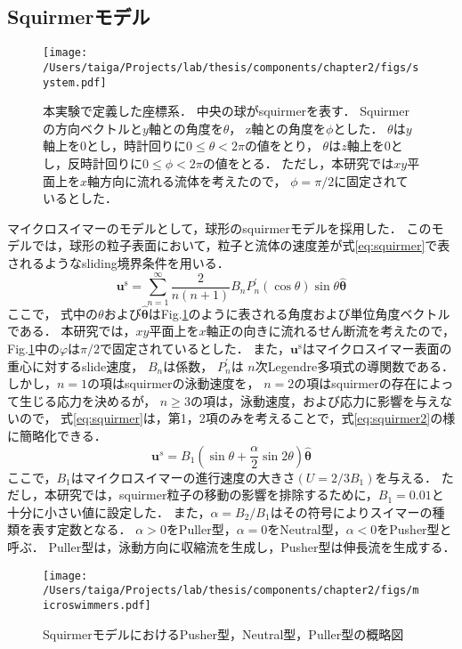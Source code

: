 \subsection{Squirmerモデル}
\label{sec:squirmer}
    \begin{figure}[htbp]
        \centering
        \texttt{[image: /Users/taiga/Projects/lab/thesis/components/chapter2/figs/system.pdf]}
        \caption{本実験で定義した座標系．
        中央の球がsquirmerを表す．
        Squirmerの方向ベクトルと$y$軸との角度を$\theta$，
        z軸との角度を$\phi$とした．
        $\theta$は$y$軸上を$0$とし，時計回りに$0 \leq \theta < 2 \pi$の値をとり，
        $\theta$は$z$軸上を$0$とし，反時計回りに$0 \leq \phi < 2 \pi$の値をとる．
        ただし，本研究では$xy$平面上を$x$軸方向に流れる流体を考えたので，
        $\phi = \pi / 2$に固定されているとした．}
        \label{fig:system}
    \end{figure}

マイクロスイマーのモデルとして，球形のsquirmerモデル\cite{squirmer}を採用した．
このモデルでは，球形の粒子表面において，粒子と流体の速度差が式\eqref{eq:squirmer}で表されるようなsliding境界条件を用いる．
    \begin{equation}
        \boldsymbol{u}^\mathrm{s} = 
            \sum_{n=1}^\infty\frac{2}{n(n + 1)} B_n P_n^\prime(\cos{\theta}) \sin{\theta} \hat{\boldsymbol{\theta}}
        \label{eq:squirmer}
    \end{equation}
ここで， 式中の$\theta$および$\boldsymbol{\hat{\theta}}$はFig.\ref{fig:system}のように表される角度および単位角度ベクトルである．
本研究では，$xy$平面上を$x$軸正の向きに流れるせん断流を考えたので，
Fig.\ref{fig:system}中の$\varphi$は$\pi / 2$で固定されているとした．
また，$\boldsymbol{u}^\mathrm{s}$はマイクロスイマー表面の重心に対するslide速度，
$B_n$は係数，
$P^\prime_n$は $n$次Legendre多項式の導関数である．
しかし，$n=1$の項はsquirmerの泳動速度を，
$n=2$の項はsquirmerの存在によって生じる応力を決めるが，
$n \geq 3$の項は，泳動速度，および応力に影響を与えないので，
式\eqref{eq:squirmer}は，第1，2項のみを考えることで，式\eqref{eq:squirmer2}の様に簡略化できる．
    \begin{equation}
        \boldsymbol{u}^s =
            B_1 \left( \sin{\theta} + \frac{\alpha}{2} \sin{2\theta} \right) \hat{\boldsymbol{\theta}}
        \label{eq:squirmer2}
    \end{equation}
ここで，$B_1$はマイクロスイマーの進行速度の大きさ$(U = 2/3 B_1)$を与える．
ただし，本研究では，squirmer粒子の移動の影響を排除するために，$B_1 = 0.01$と十分に小さい値に設定した．
また，$\alpha = B_2/B_1$はその符号によりスイマーの種類を表す定数となる．
$\alpha > 0$をPuller型，$\alpha = 0$をNeutral型，$\alpha < 0$をPusher型と呼ぶ．
Puller型は，泳動方向に収縮流を生成し，Pusher型は伸長流を生成する．
    \begin{figure}[H]
        \centering
        \texttt{[image: /Users/taiga/Projects/lab/thesis/components/chapter2/figs/microswimmers.pdf]}
        \caption{SquirmerモデルにおけるPusher型，Neutral型，Puller型の概略図}
        \label{fig:squirmermodel}
    \end{figure}
